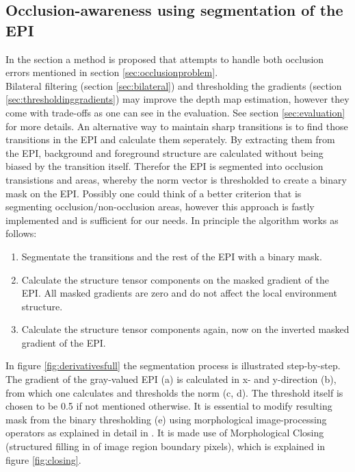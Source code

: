 \documentclass  [
  paper    = a4,
  BCOR     = 10mm,
  twoside,
  fontsize = 12pt,
  fleqn,
  toc      = bibnumbered,
  toc      = listofnumbered,
  numbers  = noendperiod,
  headings = normal,
  listof   = leveldown,
  version  = 3.03
]                                       {scrreprt}
\begin{document}
 \subsection{Occlusion-awareness using segmentation of the EPI}
 In the section a method is proposed that attempts to handle both occlusion errors mentioned in section \ref{sec:occlusionproblem}.\\
 Bilateral filtering (section \ref{sec:bilateral}) and thresholding the gradients (section \ref{sec:thresholdinggradients}) may improve the depth map estimation, however they come with trade-offs as one can see in the evaluation. See section \ref{sec:evaluation} for more details. An alternative way to maintain sharp transitions is to find those transitions in the EPI and calculate them seperately. By extracting them from the EPI, background and foreground structure are calculated without being biased by the transition itself. Therefor the EPI is segmented into occlusion transistions and areas, whereby the norm vector is thresholded to create a binary mask on the EPI. Possibly one could think of a better criterion that is segmenting occlusion/non-occlusion areas, however this approach is fastly implemented and is sufficient for our needs. In principle the algorithm works as follows:
 \begin{enumerate}
 	\item Segmentate the transitions and the rest of the EPI with a binary mask.
 	\item Calculate the structure tensor components on the masked gradient of the EPI. All masked gradients are zero and do not affect the local environment structure.
 	\item Calculate the structure tensor components again, now on the inverted masked gradient of the EPI.
 \end{enumerate}
 In figure \ref{fig:derivativesfull} the segmentation process is illustrated step-by-step. The gradient of the gray-valued EPI (a) is calculated in x- and y-direction (b), from which one calculates and thresholds the norm (c, d). The threshold itself is chosen to be 0.5 if not mentioned otherwise. It is essential to modify resulting mask from the binary thresholding (e)  using morphological image-processing operators as explained in detail in \cite{homepages.inf.ed.ac.uk}. It is made use of Morphological Closing (structured filling in of image region boundary pixels), which is explained in figure \ref{fig:closing}.\\
\end{document}

